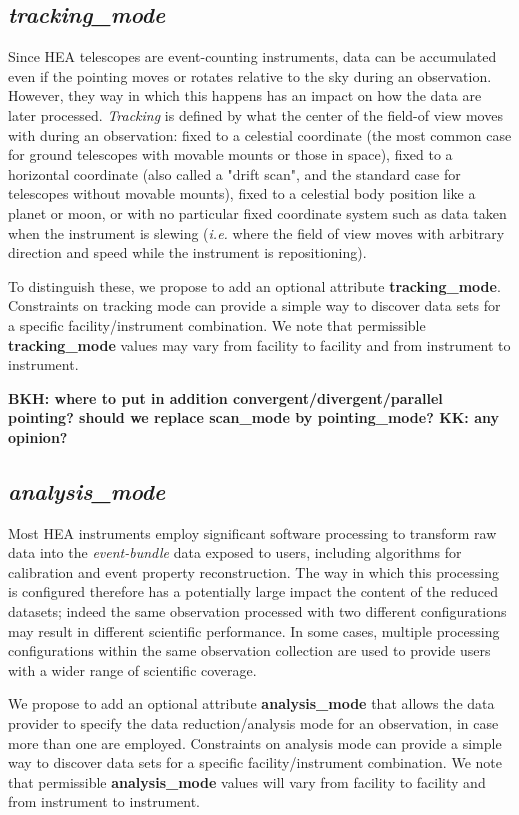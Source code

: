 \documentclass[11pt,a4paper]{ivoa}
\begin{document}
\subsection{{\em tracking\_mode}}

Since \gls{HEA}  telescopes are  event-counting instruments, data can be accumulated even if the pointing moves or rotates relative to the sky during an observation.  However, they way in which this happens has an impact on how the data are later processed. \emph{Tracking} is defined by what the  center of the field-of view moves with during an observation: fixed to a celestial coordinate (the most common case for ground telescopes with movable mounts or those in space),  fixed to a horizontal coordinate (also called a "drift scan", and the standard case for telescopes without movable mounts),  fixed to a celestial body position like a planet or moon, or with no particular fixed coordinate system such as data taken when the instrument is slewing (\emph{i.e.} where the field of view moves with arbitrary direction and speed while the instrument is repositioning).

To distinguish these, we propose to add an optional attribute {\bf tracking\_mode}. Constraints on tracking mode can provide a simple way to discover data sets for a specific facility/instrument combination. We note that permissible {\bf tracking\_mode} values may vary from facility to facility and from instrument to instrument.

{\bf BKH: where to put in addition convergent/divergent/parallel pointing? should we replace scan\_mode by pointing\_mode? KK: any opinion?}

\subsection{{\em analysis\_mode}}

Most \gls{HEA} instruments employ significant software processing to transform raw data into the \emph{event-bundle} data exposed to users, including algorithms for calibration and event property reconstruction. The way in which this processing is configured therefore has a potentially large impact the content of the reduced datasets; indeed the same observation processed with two different configurations may result in different scientific performance. In some cases, multiple processing configurations within the same observation collection are used to provide users with a wider range of scientific coverage.

We propose to add an optional attribute {\bf analysis\_mode} that allows the data provider to specify the data reduction/analysis mode for an observation, in case more than one are employed. Constraints on analysis mode can provide a simple way to discover data sets for a specific facility/instrument combination. We note that permissible {\bf analysis\_mode} values will vary from facility to facility and from instrument to instrument.
\end{document}
